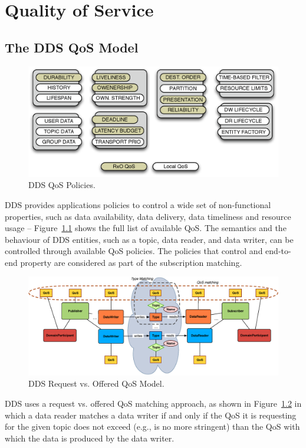 \chapter{Quality of Service}\label{Chapter:QoS}
\section{The DDS QoS Model} \label{Section:DDS:QoS} 
\begin{figure}[t]
	\centering
	\includegraphics[scale=0.6]{figs/QoS-Map.eps}
	\caption{DDS QoS Policies.}
	\label{Figure:DDS:QoSMap}
\end{figure}
\ac{DDS} provides applications policies to control a wide set
of non-functional properties, such as data availability, data
delivery, data timeliness and resource usage -- Figure~\ref{Figure:DDS:QoSMap} shows
the full list of available QoS.  
The semantics and the behaviour of \ac{DDS} entities, such as a topic, data
reader, and data writer, can be controlled through available \ac{QoS}
policies.  The policies that control and end-to-end property are
considered as part of the subscription matching. 
\begin{figure}[t]
	\centering
	\includegraphics[scale=0.4]{figs/RxO.eps}
	\caption{DDS Request vs. Offered QoS Model.}
	\label{Figure:DDS:RxO}
\end{figure}
\ac{DDS} uses a request vs. offered QoS matching approach, as
shown in Figure~\ref{Figure:DDS:RxO} in which a
data reader matches a data writer if and only if the QoS it is
requesting for the given topic does not exceed (e.g., is no more
stringent) than the QoS with which the data is produced by the data
writer.  

